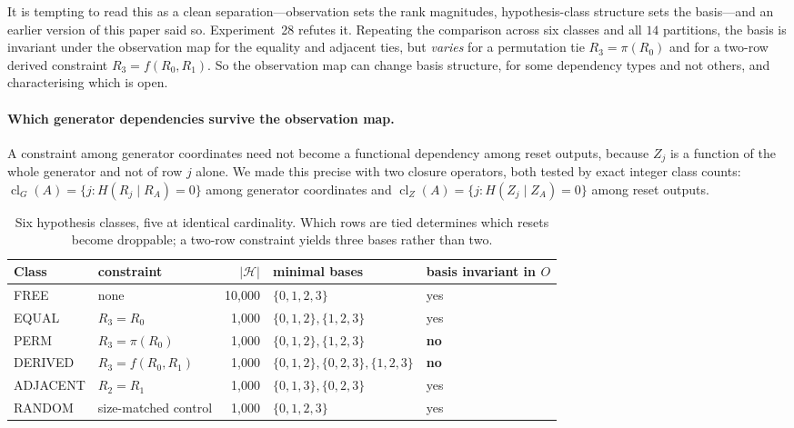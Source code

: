 \documentclass[11pt]{article}
\newcommand{\HH}{\ensuremath{\mathcal{H}}}
\begin{document}
It is tempting to read this as a clean separation---observation sets the rank magnitudes,
hypothesis-class structure sets the basis---and an earlier version of this paper said so.
Experiment~28 refutes it. Repeating the comparison across six classes and all $14$
partitions, the basis is invariant under the observation map for the equality and adjacent
ties, but \emph{varies} for a permutation tie $R_3 = \pi(R_0)$ and for a two-row derived
constraint $R_3 = f(R_0, R_1)$. So the observation map can change basis structure, for some
dependency types and not others, and characterising which is open.

\paragraph{Which generator dependencies survive the observation map.}
A constraint among generator coordinates need not become a functional dependency among
reset outputs, because $Z_j$ is a function of the whole generator and not of row $j$ alone.
We made this precise with two closure operators, both tested by exact integer class counts:
$\operatorname{cl}_G(A) = \{j : H(R_j \mid R_A) = 0\}$ among generator coordinates and
$\operatorname{cl}_Z(A) = \{j : H(Z_j \mid Z_A) = 0\}$ among reset outputs.

\begin{table}[h]
\centering
\begin{tabular}{llrll}
\toprule
Class & constraint & $|\HH|$ & minimal bases & basis invariant in $O$ \\
\midrule
FREE     & none                        & 10{,}000 & $\{0,1,2,3\}$ & yes \\
EQUAL    & $R_3 = R_0$                 & 1{,}000  & $\{0,1,2\},\{1,2,3\}$ & yes \\
PERM     & $R_3 = \pi(R_0)$            & 1{,}000  & $\{0,1,2\},\{1,2,3\}$ & \textbf{no} \\
DERIVED  & $R_3 = f(R_0,R_1)$          & 1{,}000  & $\{0,1,2\},\{0,2,3\},\{1,2,3\}$ & \textbf{no} \\
ADJACENT & $R_2 = R_1$                 & 1{,}000  & $\{0,1,3\},\{0,2,3\}$ & yes \\
RANDOM   & size-matched control        & 1{,}000  & $\{0,1,2,3\}$ & yes \\
\bottomrule
\end{tabular}
\caption{Six hypothesis classes, five at identical cardinality. Which rows are tied
determines which resets become droppable; a two-row constraint yields three bases rather
than two.}
\label{tab:dependency}
\end{table}
\end{document}
